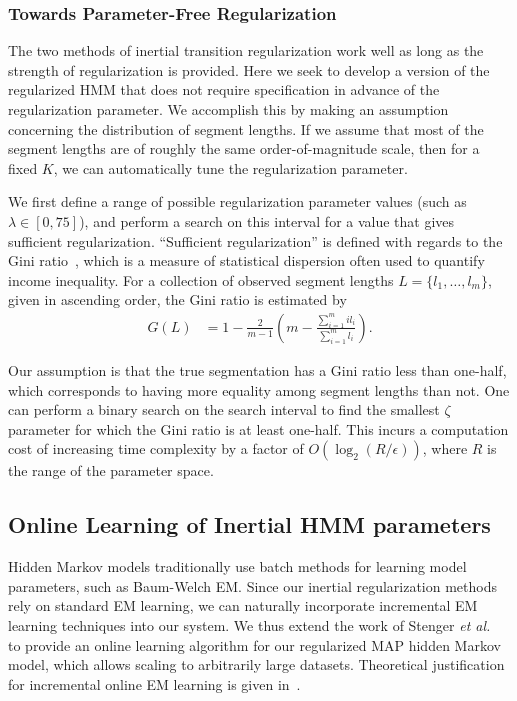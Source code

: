 \documentclass[letterpaper]{article}
\begin{document}
\subsubsection{Towards Parameter-Free Regularization}\label{sec:param-free}

The two methods of inertial transition regularization work well as long as the strength of regularization is provided. Here we seek to develop a version of the regularized HMM that does not require specification in advance of the regularization parameter. We accomplish this by making an assumption concerning the distribution of segment lengths. If we assume that most of the segment lengths are of roughly the same order-of-magnitude scale, then for a fixed $K$, we can automatically tune the regularization parameter.

We first define a range of possible regularization parameter values (such as $\lambda \in [0, 75]$), and perform a search on this interval for a value that gives sufficient regularization. ``Sufficient regularization'' is defined with regards to the Gini ratio~\cite{gini1936,wiki:1}, which is a measure of statistical dispersion often used to quantify income inequality. For a collection of observed segment lengths $L = \{l_1, \ldots, l_m\}$, given in ascending order, the Gini ratio is estimated by
\begin{align*}
    G(L) &= 1 - \frac{2}{m-1}\left(m - \frac{\sum_{i=1}^{m} i l_i}{\sum_{i=1}^{m} l_i}\right).
\end{align*}

Our assumption is that the true segmentation has a Gini ratio less than one-half, which corresponds to having more equality among segment lengths than not. One can perform a binary search on the search interval to find the smallest $\zeta$ parameter for which the Gini ratio is at least one-half. This incurs a computation cost of increasing time complexity by a factor of $O(\log_2 (R / \epsilon))$, where $R$ is the range of the parameter space.

\subsection{Online Learning of Inertial HMM parameters}

Hidden Markov models traditionally use batch methods for learning model parameters, such as Baum-Welch EM. Since our inertial regularization methods rely on standard EM learning, we can naturally incorporate incremental EM learning techniques into our system. We thus extend the work of Stenger \emph{et al.}~\cite{stenger2001} to provide an online learning algorithm for our regularized MAP hidden Markov model, which allows scaling to arbitrarily large datasets. Theoretical justification for incremental online EM learning is given in~\cite{Neal:1999:VEA:308574.308679}.
\end{document}
